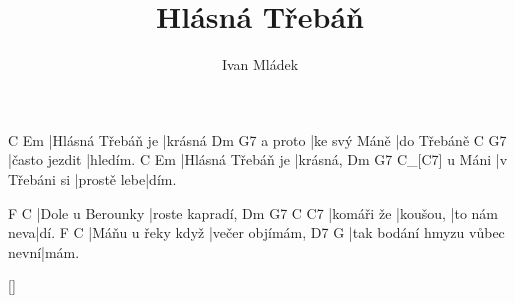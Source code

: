 \documentclass{song}
\title{Hlásná Třebáň}
\author{Ivan Mládek}
\begin{document}
C                 Em
|Hlásná Třebáň je |krásná
        Dm           G7
a proto |ke svý Máně |do Třebáně
C             G7
|často jezdit |hledím.
C                 Em
|Hlásná Třebáň je |krásná,
       Dm            G7          C_[C7]
u Máni |v Třebáni si |prostě lebe|dím.
\endstrophe
 
\strophe
F                C
|Dole u Berounky |roste kapradí,
Dm         G7       C           C7
|komáři že |koušou, |to nám neva|dí.
F                 C
|Máňu u řeky když |večer objímám,
D7                           G
|tak bodání hmyzu vůbec nevní|mám.
\endstrophe
 

\ref{}
\end{document}

